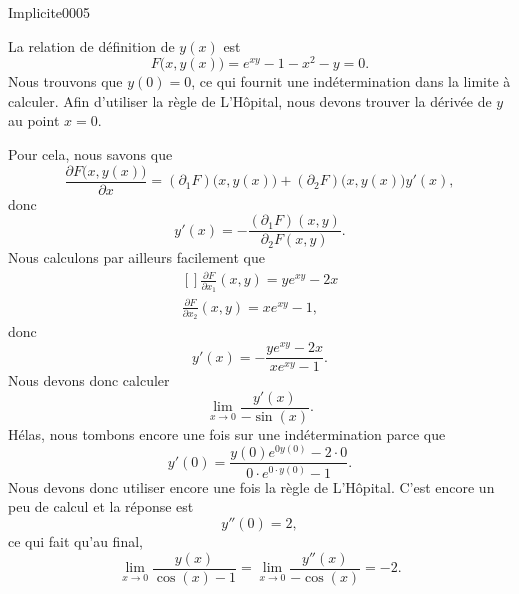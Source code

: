 
\begin{corrige}{Implicite0005}

	La relation de définition de $y(x)$ est
	\begin{equation}
		F\big( x,y(x) \big)=e^{xy}-1-x^2-y=0.
	\end{equation}
	Nous trouvons que $y(0)=0$, ce qui fournit une indétermination dans la limite à calculer. Afin d'utiliser la règle de L'Hôpital, nous devons trouver la dérivée de $y$ au point $x=0$.

	Pour cela, nous savons que 
	\begin{equation}
		\frac{ \partial F\big( x,y(x) \big) }{ \partial x }=(\partial_1F)\big( x,y(x) \big)+(\partial_2F)\big( x,y(x) \big)y'(x),
	\end{equation}
	donc
	\begin{equation}
		y'(x)=-\frac{ (\partial_1F)(x,y) }{ \partial_2F(x,y) }.
	\end{equation}
	Nous calculons par ailleurs facilement que
	\begin{equation}
		\begin{aligned}[]
			\frac{ \partial F }{ \partial x_1}(x,y) =ye^{xy}-2x\\
			\frac{ \partial F }{ \partial x_2}(x,y) =xe^{xy}-1,
		\end{aligned}
	\end{equation}
	donc
	\begin{equation}
		y'(x)=-\frac{ ye^{xy}-2x }{ xe^{xy}-1 }.
	\end{equation}
	Nous devons donc calculer
	\begin{equation}
		\lim_{x\to 0} \frac{ y'(x) }{ -\sin(x) }.
	\end{equation}
	Hélas, nous tombons encore une fois sur une indétermination parce que
	\begin{equation}
		y'(0)=\frac{ y(0) e^{0y(0)}-2\cdot 0 }{ 0\cdot e^{0\cdot y(0)}-1 }.
	\end{equation}
	Nous devons donc utiliser encore une fois la règle de L'Hôpital. C'est encore un peu de calcul et la réponse est
	\begin{equation}
		y''(0)=2,
	\end{equation}
	ce qui fait qu'au final,
	\begin{equation}
		\lim_{x\to 0} \frac{ y(x) }{ \cos(x)-1 }=\lim_{x\to 0} \frac{ y''(x) }{ -\cos(x) }=-2.
	\end{equation}
\end{corrige}
